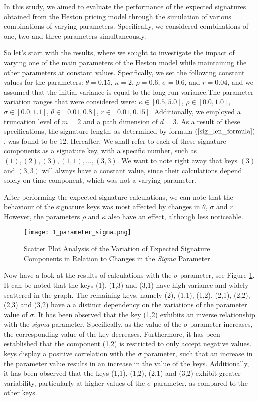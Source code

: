 \documentclass[12pt,a4paper]{report}
\theoremstyle{definition}
\begin{document}
In this study, we aimed to evaluate the performance of the expected signatures obtained from the Heston pricing model through the simulation of various combinations of varying parameters. Specifically, we considered combinations of one, two and three parameters simultaneously. %

So let's start with the results, where we sought to investigate the impact of varying one of the main parameters of the Heston model while maintaining the other parameters at constant values. Specifically, we set the following constant values for the parameters: $\theta=0.15$, $\kappa=2$, $\rho=0.6$, $\sigma=0.6$, and $r=0.04$, and we assumed that the initial variance is equal to the long-run variance.The parameter variation ranges that were considered were: $\kappa\in [0.5,5.0]$, $\rho\in [0.0,1.0]$, $\sigma\in [0.0,1.1]$, $\theta \in [0.01,0.8]$, $r\in [0.01,0.15]$. Additionally, we employed a truncation level of $m=2$ and a path dimension of $d=3$. As a result of these specifications, the signature length, as determined by formula $(\ref{sig_len_formula})$, was found to be $12$. Hereafter, We shall refer to each of these signature components as a signature key, with a specific number, such as $(1), (2), (3), (1,1), ..., (3,3)$. We want to note right away that keys $(3)$ and $(3,3)$ will always have a constant value, since their calculations depend solely on time component, which was not a varying parameter.

After performing the expected signature calculations, we can note that the behaviour of the signature keys was most affected by changes in $\theta$, $\sigma$ and $r$. However, the parameters $\rho$ and $\kappa$ also have an effect, although less noticeable.

\begin{figure}[!htbp]
	\centering
	\texttt{[image: 1\_parameter\_sigma.png]}
	\caption{Scatter Plot Analysis of the Variation of Expected Signature Components in Relation to Changes in the \textit{Sigma} Parameter.}
	\label{1_parameter_sigma}
\end{figure}


Now have a look at the results of calculations with the $\sigma$ parameter, see Figure \ref{1_parameter_sigma}. It can be noted that the keys (1), (1,3) and (3,1) have high variance and widely scattered in the graph. The remaining keys, namely (2), (1,1), (1,2), (2,1), (2,2), (2,3) and (3,2) have a a distinct dependency on the variations of the parameter value of $\sigma$. It has been observed that the key (1,2) exhibits an inverse relationship with the \textit{sigma} parameter. Specifically, as the value of the $\sigma$ parameter increases, the corresponding value of the key decreases. Furthermore, it has been established that the component (1,2) is restricted to only accept negative values. keys display a positive correlation with the $\sigma$ parameter, such that an increase in the parameter value results in an increase in the value of the keys. Additionally, it has been observed that the keys (1,1), (1,2), (2,1) and (3,2) exhibit greater variability, particularly at higher values of the $\sigma$ parameter, as compared to the other keys.
\end{document}

